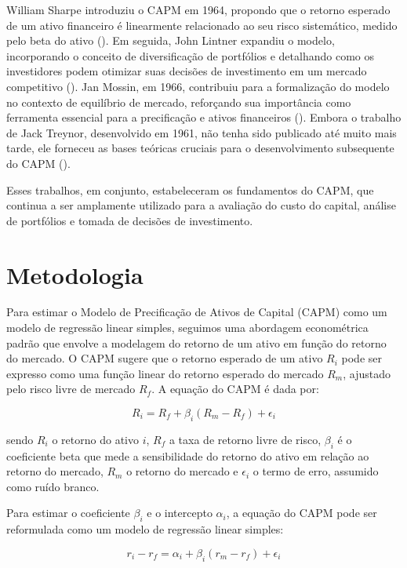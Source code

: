 \documentclass[
  12pt,
  a4paperpaper,
]{article}
\begin{document}
William Sharpe introduziu o CAPM em 1964, propondo que o retorno
esperado de um ativo financeiro é linearmente relacionado ao seu risco
sistemático, medido pelo beta do ativo
(). Em seguida, John Lintner
expandiu o modelo, incorporando o conceito de diversificação de
portfólios e detalhando como os investidores podem otimizar suas
decisões de investimento em um mercado competitivo
(). Jan Mossin, em 1966,
contribuiu para a formalização do modelo no contexto de equilíbrio de
mercado, reforçando sua importância como ferramenta essencial para a
precificação e ativos financeiros (). Embora o trabalho de Jack Treynor, desenvolvido em 1961, não
tenha sido publicado até muito mais tarde, ele forneceu as bases
teóricas cruciais para o desenvolvimento subsequente do CAPM
().

Esses trabalhos, em conjunto, estabeleceram os fundamentos do CAPM, que
continua a ser amplamente utilizado para a avaliação do custo do
capital, análise de portfólios e tomada de decisões de investimento.

\section{Metodologia}\label{sec-met}

Para estimar o Modelo de Precificação de Ativos de Capital (CAPM) como
um modelo de regressão linear simples, seguimos uma abordagem
econométrica padrão que envolve a modelagem do retorno de um ativo em
função do retorno do mercado. O CAPM sugere que o retorno esperado de um
ativo \(R_i\) pode ser expresso como uma função linear do retorno
esperado do mercado \(R_m\), ajustado pelo risco livre de mercado
\(R_f\). A equação do CAPM é dada por:

\[
R_i = R_f + \beta_i (R_m - R_f) + \epsilon_i
\]

sendo \(R_i\) o retorno do ativo \(i\), \(R_f\) a taxa de retorno livre
de risco, \(\beta_i\) é o coeficiente beta que mede a sensibilidade do
retorno do ativo em relação ao retorno do mercado, \(R_m\) o retorno do
mercado e \(\epsilon_i\) o termo de erro, assumido como ruído branco.

Para estimar o coeficiente \(\beta_i\) e o intercepto \(\alpha_i\), a
equação do CAPM pode ser reformulada como um modelo de regressão linear
simples:

\[
r_i - r_f = \alpha_i + \beta_i (r_m - r_f) + \epsilon_i
\]
\end{document}
